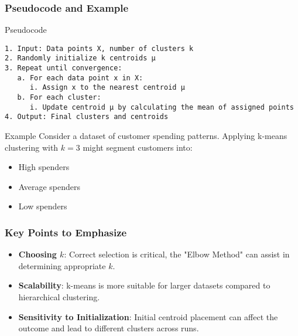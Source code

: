 \documentclass[aspectratio=169]{beamer}
\begin{document}
\begin{frame}[fragile]
    \frametitle{Pseudocode and Example}
    \begin{block}{Pseudocode}
    \begin{lstlisting}
1. Input: Data points X, number of clusters k
2. Randomly initialize k centroids μ
3. Repeat until convergence:
   a. For each data point x in X:
      i. Assign x to the nearest centroid μ
   b. For each cluster:
      i. Update centroid μ by calculating the mean of assigned points
4. Output: Final clusters and centroids
    \end{lstlisting}
    \end{block}

    \begin{block}{Example}
        Consider a dataset of customer spending patterns. Applying k-means clustering with \( k = 3 \) might segment customers into:
        \begin{itemize}
            \item High spenders
            \item Average spenders
            \item Low spenders
        \end{itemize}
    \end{block}
\end{frame}

\begin{frame}[fragile]
    \frametitle{Key Points to Emphasize}
    \begin{itemize}
        \item \textbf{Choosing \( k \)}: Correct selection is critical, the "Elbow Method" can assist in determining appropriate \( k \).
        \item \textbf{Scalability}: k-means is more suitable for larger datasets compared to hierarchical clustering.
        \item \textbf{Sensitivity to Initialization}: Initial centroid placement can affect the outcome and lead to different clusters across runs.
    \end{itemize}
\end{frame}
\end{document}
